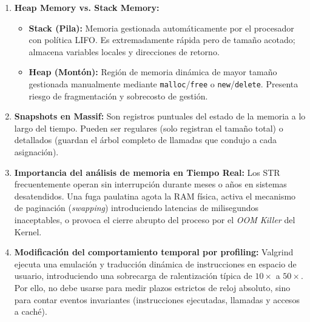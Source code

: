 \documentclass[11pt,a4paper]{article}
\begin{document}
\begin{enumerate}[label=\textbf{2.1.\arabic*.}]
    \item \textbf{Heap Memory vs. Stack Memory:}
    \begin{itemize}
        \item \textbf{Stack (Pila):} Memoria gestionada automáticamente por el procesador con política LIFO. Es extremadamente rápida pero de tamaño acotado; almacena variables locales y direcciones de retorno.
        \item \textbf{Heap (Montón):} Región de memoria dinámica de mayor tamaño gestionada manualmente mediante \texttt{malloc}/\texttt{free} o \texttt{new}/\texttt{delete}. Presenta riesgo de fragmentación y sobrecosto de gestión.
    \end{itemize}

    \item \textbf{Snapshots en Massif:} Son registros puntuales del estado de la memoria a lo largo del tiempo. Pueden ser regulares (solo registran el tamaño total) o detallados (guardan el árbol completo de llamadas que condujo a cada asignación).

    \item \textbf{Importancia del análisis de memoria en Tiempo Real:} Los STR frecuentemente operan sin interrupción durante meses o años en sistemas desatendidos. Una fuga paulatina agota la RAM física, activa el mecanismo de paginación (\textit{swapping}) introduciendo latencias de milisegundos inaceptables, o provoca el cierre abrupto del proceso por el \textit{OOM Killer} del Kernel.

    \item \textbf{Modificación del comportamiento temporal por profiling:} Valgrind ejecuta una emulación y traducción dinámica de instrucciones en espacio de usuario, introduciendo una sobrecarga de ralentización típica de $10\times$ a $50\times$. Por ello, no debe usarse para medir plazos estrictos de reloj absoluto, sino para contar eventos invariantes (instrucciones ejecutadas, llamadas y accesos a caché).
\end{enumerate}
\end{document}
